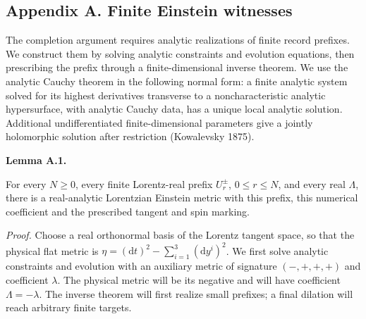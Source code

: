\documentclass[
  english,
  11pt,
  reqno]{amsart}
\makeatletter
\newcommand{\pandocstatementheading}[1]{%
  \par\addpenalty{\@beginparpenalty}%
  \addvspace{.5\baselineskip plus .2\baselineskip minus .2\baselineskip}%
  {\normalfont\bfseries #1\par}%
  \nobreak\@afterindenttrue\@afterheading
}
\makeatother
\begin{document}
\protect{}\label{sec:es-finite-witnesses}

\subsection{Appendix A. Finite Einstein
witnesses}\label{appendix-a.-finite-einstein-witnesses}

The completion argument requires analytic realizations of finite record
prefixes. We construct them by solving analytic constraints and
evolution equations, then prescribing the prefix through a
finite-dimensional inverse theorem. We use the analytic Cauchy theorem
in the following normal form: a finite analytic system solved for its
highest derivatives transverse to a noncharacteristic analytic
hypersurface, with analytic Cauchy data, has a unique local analytic
solution. Additional undifferentiated finite-dimensional parameters give
a jointly holomorphic solution after restriction (Kowalevsky 1875).

\pandocstatementheading{\protect{}\label{lem:es-finite-witness}Lemma A.1.}

For every \(N\ge0\), every finite Lorentz-real prefix \(U_r^\pm\),
\(0\le r\le N\), and every real \(\Lambda\), there is a real-analytic
Lorentzian Einstein metric with this prefix, this numerical coefficient
and the prescribed tangent and spin marking.

\emph{Proof.} Choose a real orthonormal basis of the Lorentz tangent
space, so that the physical flat metric is
\(\eta=(\mathrm dt)^2-\sum_{i=1}^3(\mathrm dy^i)^2\). We first solve
analytic constraints and evolution with an auxiliary metric of signature
\((-,+,+,+)\) and coefficient \(\lambda\). The physical metric will be
its negative and will have coefficient \(\Lambda=-\lambda\). The inverse
theorem will first realize small prefixes; a final dilation will reach
arbitrary finite targets.
\end{document}
